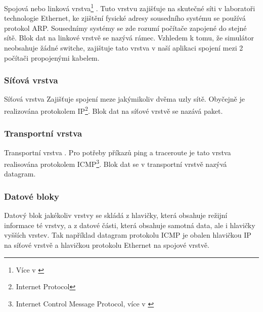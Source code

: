Spojová nebo linková vrstva\footnote{Více v \cite{wiki:linkova_vrstva}} \cite{wiki:referencni_model}. Tuto vrstvu zajišťuje na skutečné síti v laboratoři technologie Ethernet\cite{wiki:ethernet}, ke zjištění fysické adresy sousedního systému se používá protokol ARP\cite{wiki:arp}. Sousednímy systémy se zde rozumí počítače zapojené do stejné sítě. Blok dat na linkové vrstvě se nazývá rámec. Vzhledem k tomu, že simulátor neobsahuje žádné switche, zajištuje tato vrstva v naší aplikaci spojení mezi 2 počítači propojenými kabelem.

\subsubsection{Síťová vrstva}

Síťová vrstva \cite{wiki:referencni_model} Zajišťuje spojení meze jakýmikoliv dvěma uzly sítě. Obyčejně je realizována protokolem IP\footnote{Internet Protocol}. Blok dat na síťové vrstvě se nazává paket.

\subsubsection{Transportní vrstva}

Transportní vrstva \cite{wiki:referencni_model}. Pro potřeby příkazů ping a traceroute je tato vrstva realisována protokolem ICMP\footnote{Internet Control Message Protocol, více v \cite{wiki:icmp}}. Blok dat se v transportní vrstvě nazývá datagram.

\subsubsection{Datové bloky}\label{datove_bloky}

Datový blok jakékoliv vrstvy se skládá z hlavičky, která obsahuje režijní informace té vrstvy, a z datové části, která obsahuje samotná data, ale i hlavičky vyšších vrstev. Tak například datagram protokolu ICMP je obalen hlavičkou IP na síťové vrstvě a hlavičkou protokolu Ethernet na spojové vrstvě.


